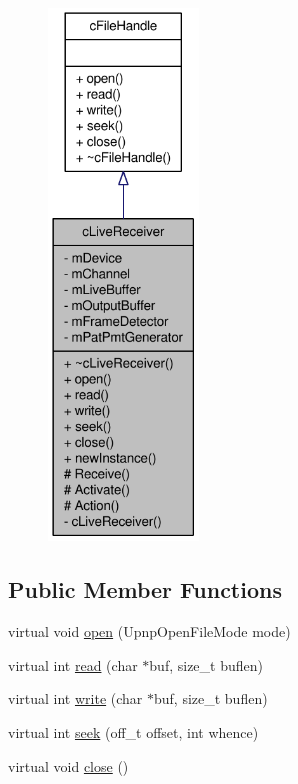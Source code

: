 \begin{figure}[H]
\begin{center}
\leavevmode
\includegraphics[height=400pt]{classcLiveReceiver__coll__graph}
\end{center}
\end{figure}
\subsection*{Public Member Functions}
\begin{CompactItemize}
\item 
virtual void \hyperlink{classcLiveReceiver_b8e751f641be1da4a925106e3dd062e9}{open} (UpnpOpenFileMode mode)
\item 
virtual int \hyperlink{classcLiveReceiver_4a19e1fd4e1d043fb091bfb01a9cbf08}{read} (char $\ast$buf, size\_\-t buflen)
\item 
virtual int \hyperlink{classcLiveReceiver_eb56988441b589b6e34ea01825dfb183}{write} (char $\ast$buf, size\_\-t buflen)
\item 
virtual int \hyperlink{classcLiveReceiver_efb4156ef247773873dee42053e94edf}{seek} (off\_\-t offset, int whence)
\item 
virtual void \hyperlink{classcLiveReceiver_5b8beb2bc6809aacbdb087e31e836a27}{close} ()
\end{CompactItemize}
